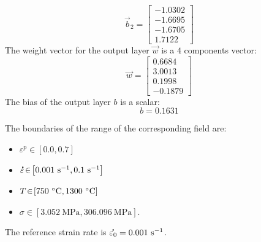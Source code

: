 \documentclass[algorithms,article,submit,pdftex,moreauthors]{Definitions/mdpi}
\DeclareRobustCommand{\mdot}[1]{\accentset{\mbox{\bfseries .}}{#1}}
\DeclareRobustCommand{\ps}{\text{s}^{-1}}
\DeclareRobustCommand{\MPa}{\text{MPa}}
\begin{document}
\begin{equation*}
\overrightarrow{b}_2 = \left[
\begin{array}{r}
	-1.0302 \\
	-1.6695 \\
	-1.6705 \\
	1.7122
\end{array}\right]
\end{equation*}
The weight vector for the output layer $\overrightarrow{w}$ is a $4$ components vector:
\begin{equation*}
\overrightarrow{w} = \left[
\begin{array}{r}
	0.6684  \\
	3.0013  \\
	0.1998  \\
	-0.1879
\end{array}\right]
\end{equation*}
The bias of the output layer $b$ is a scalar:
\begin{equation*}
b = 0.1631
\end{equation*}

The boundaries of the range of the corresponding field are:
\begin{itemize}
\item $\varepsilon^p\!\in\!\left[0.0,0.7\right]$
\item $\mdot{\varepsilon}\!\in\!\left[0.001~\ps,0.1~\ps\right]$
\item $T\!\in\!\left[750~\celsius,1300~\celsius\right]$
\item $\sigma\!\in\!\left[3.052~\MPa,306.096~\MPa\right]$.
\end{itemize}
The reference strain rate is $\mdot{\varepsilon_0} = 0.001~\ps$.





%
\end{document}

